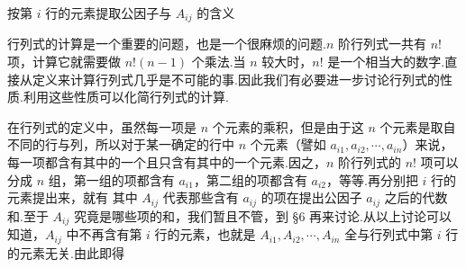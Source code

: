 

\begin{fdeep}{按第 $i$ 行的元素提取公因子与 $A_{ij}$ 的含义}

行列式的计算是一个重要的问题，也是一个很麻烦的问题.$n$ 阶行列式一共有 $n!$ 项，计算它就需要做 $n!(n-1)$ 个乘法.当 $n$ 较大时，$n!$ 是一个相当大的数字.直接从定义来计算行列式几乎是不可能的事.因此我们有必要进一步讨论行列式的性质.利用这些性质可以化简行列式的计算.

在行列式的定义中，虽然每一项是 $n$ 个元素的乘积，但是由于这 $n$ 个元素是取自不同的行与列，所以对于某一确定的行中 $n$ 个元素（譬如 $a_{i1},a_{i2},\cdots,a_{in}$）来说，每一项都含有其中的一个且只含有其中的一个元素.因之，$n$ 阶行列式的 $n!$ 项可以分成 $n$ 组，第一组的项都含有 $a_{i1}$，第二组的项都含有 $a_{i2}$，等等.再分别把 $i$ 行的元素提出来，就有
其中 $A_{ij}$ 代表那些含有 $a_{ij}$ 的项在提出公因子 $a_{ij}$ 之后的代数和.至于 $A_{ij}$ 究竟是哪些项的和，我们暂且不管，到 §6 再来讨论.从以上讨论可以知道，$A_{ij}$ 中不再含有第 $i$ 行的元素，也就是 $A_{i1},A_{i2},\cdots,A_{in}$ 全与行列式中第 $i$ 行的元素无关.由此即得
\end{fdeep}


